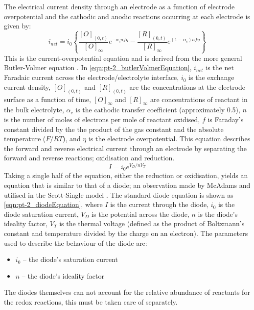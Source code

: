       The electrical current density through an electrode as a function of electrode overpotential and the cathodic and anodic reactions occurring at each electrode is given by:
      \begin{equation}
        i_{net} = i_{0} \left\{ \frac{[O]_{(0,t)}}{[O]_{\infty}}e^{-\alpha_{c}nf\eta} - \frac{[R]_{(0,t)}}{[R]_{\infty}}e^{(1-\alpha_{c})nf\eta}\right\}
        \label{eqn:pt-2_butlerVolmerEquation}
      \end{equation}
      This is the current-overpotential equation and is derived from the more general Butler-Volmer equation \cite{Merrill2005,ScottSingle2013}.
      In \cref{eqn:pt-2_butlerVolmerEquation}, $i_{net}$ is the net Faradaic current across the electrode/electrolyte interface,
      $i_{0}$ is the exchange current density,
      $[O]_{(0,t)}$ and $[R]_{(0,t)}$ are the concentrations at the electrode surface as a function of time,
      $[O]_{\infty}$ and $[R]_{\infty}$ are concentrations of reactant in the bulk electrolyte,
      $\alpha_{c}$ is the cathodic transfer coefficient (approximately 0.5),
      $n$ is the number of moles of electrons per mole of reactant oxidised,
      $f$ is Faraday's constant divided by the the product of the gas constant and the absolute temperature ($F/RT$),
      and $\eta$ is the electrode overpotential.
      This equation describes the forward and reverse electrical current through an electrode by separating the forward and reverse reactions; oxidisation and reduction.
      \begin{equation}
        I = i_0 e^{V_D / n V_T}
        \label{eqn:pt-2_diodeEquation}
      \end{equation}
      Taking a single half of the equation, either the reduction or oxidisation, yields an equation that is similar to that of a diode; an observation made by McAdams and utilised in the Scott-Single model \cite{McAdams1995}.
      The standard diode equation is shown as \cref{eqn:pt-2_diodeEquation}, where
      $I$ is the current through the diode,
      $i_0$ is the diode saturation current,
      $V_D$ is the potential across the diode,
      $n$ is the diode's ideality factor,
      $V_T$ is the thermal voltage (defined as the product of Boltzmann's constant and temperature divided by the charge on an electron).
      The parameters used to describe the behaviour of the diode are:
      \begin{itemize}
        \item $i_0$ -- the diode's saturation current
        \item $n$ -- the diode's ideality factor
      \end{itemize}
      The diodes themselves can not account for the relative abundance of reactants for the redox reactions, this must be taken care of separately.

